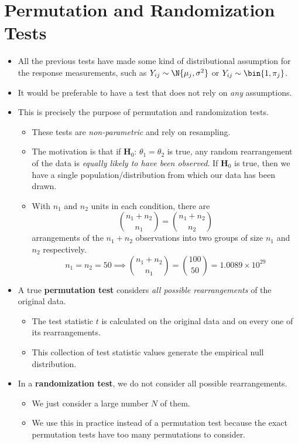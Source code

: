 \section{Permutation and Randomization Tests}
\begin{itemize}
      \item All the previous tests have made some kind of distributional assumption
            for the response measurements, such as $ Y_{ij} \sim \N{\mu_j,\sigma^2} $ or
            $ Y_{ij}\sim \bin{1,\pi_j} $.
      \item It would be preferable to have a test that does not rely on \emph{any}
            assumptions.
      \item This is precisely the purpose of permutation and randomization tests.
            \begin{itemize}
                  \item These tests are \emph{non-parametric} and rely on resampling.
                  \item The motivation is that if $ \mathbf{H}_0 $: $ \theta_1=\theta_2 $
                        is true, any random rearrangement of the data is \emph{equally likely
                              to have been observed}. If $ \mathbf{H}_0 $ is true, then we have a single population/distribution
                        from which our data has been drawn.
                  \item With $ n_1 $ and $ n_2 $ units in each condition, there are
                        \[ \binom{n_1+n_2}{n_1}=\binom{n_1+n_2}{n_2} \]
                        arrangements of the $ n_1+n_2 $ observations into two groups of size $ n_1 $
                        and $ n_2 $ respectively.
                        \[ n_1=n_2=50\implies\binom{n_1+n_2}{n_1}=\binom{100}{50}=1.0089\times 10^{29} \]
            \end{itemize}
      \item A true \textbf{permutation test} considers \emph{all possible rearrangements}
            of the original data.
            \begin{itemize}
                  \item The test statistic $ t $ is calculated on the original data and on every one of
                        its rearrangements.
                  \item This collection of test statistic values generate the empirical null distribution.
            \end{itemize}
      \item In a \textbf{randomization test}, we do not
            consider all possible rearrangements.
            \begin{itemize}
                  \item We just consider a large number $ N $ of them.
                  \item We use this in practice instead of a permutation test because
                        the exact permutation tests have too many permutations to consider.
            \end{itemize}
\end{itemize}
